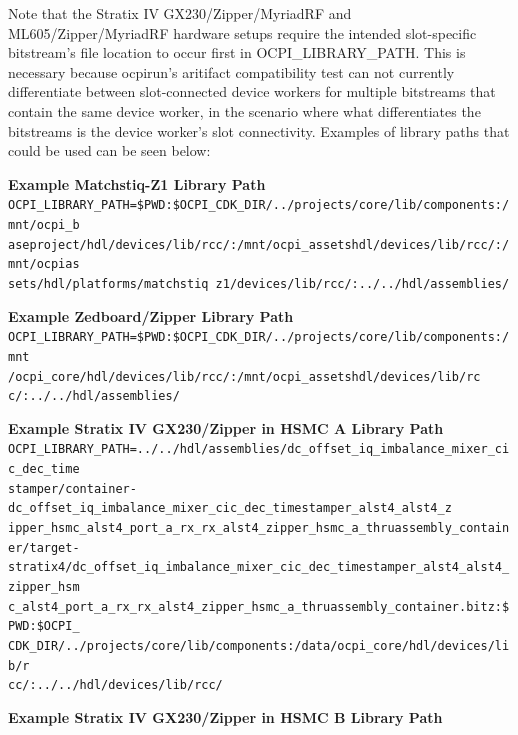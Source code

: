 \documentclass{article}
\begin{document}
\noindent Note that the Stratix IV GX230/Zipper/MyriadRF and ML605/Zipper/MyriadRF hardware setups require the intended slot-specific bitstream's file location to occur first in OCPI\_LIBRARY\_PATH. This is necessary because ocpirun's aritifact compatibility test can not currently differentiate between slot-connected device workers for multiple bitstreams that contain the same device worker, in the scenario where what differentiates the bitstreams is the device worker's slot connectivity. Examples of library paths that could be used can be seen below:\par\medskip
\noindent\textbf{Example Matchstiq-Z1 Library Path}\\
\verb|OCPI_LIBRARY_PATH=$PWD:$OCPI_CDK_DIR/../projects/core/lib/components:/mnt/ocpi_b| \\
\verb|aseproject/hdl/devices/lib/rcc/:/mnt/ocpi_assetshdl/devices/lib/rcc/:/mnt/ocpias| \\
\verb|sets/hdl/platforms/matchstiq z1/devices/lib/rcc/:../../hdl/assemblies/|
\par\medskip
\noindent\textbf{Example Zedboard/Zipper Library Path}\\
\verb|OCPI_LIBRARY_PATH=$PWD:$OCPI_CDK_DIR/../projects/core/lib/components:/mnt| \\
\verb|/ocpi_core/hdl/devices/lib/rcc/:/mnt/ocpi_assetshdl/devices/lib/rc| \\
\verb|c/:../../hdl/assemblies/|
\par\medskip
\noindent\textbf{Example Stratix IV GX230/Zipper in HSMC A Library Path}\\
\verb|OCPI_LIBRARY_PATH=../../hdl/assemblies/dc_offset_iq_imbalance_mixer_cic_dec_time| \\
\verb|stamper/container-dc_offset_iq_imbalance_mixer_cic_dec_timestamper_alst4_alst4_z| \\
\verb|ipper_hsmc_alst4_port_a_rx_rx_alst4_zipper_hsmc_a_thruassembly_container/target-| \\
\verb|stratix4/dc_offset_iq_imbalance_mixer_cic_dec_timestamper_alst4_alst4_zipper_hsm| \\
\verb|c_alst4_port_a_rx_rx_alst4_zipper_hsmc_a_thruassembly_container.bitz:$PWD:$OCPI_| \\
\verb|CDK_DIR/../projects/core/lib/components:/data/ocpi_core/hdl/devices/lib/r| \\
\verb|cc/:../../hdl/devices/lib/rcc/|
\par\medskip
\pagebreak
\noindent\textbf{Example Stratix IV GX230/Zipper in HSMC B Library Path}\\
\end{document}
